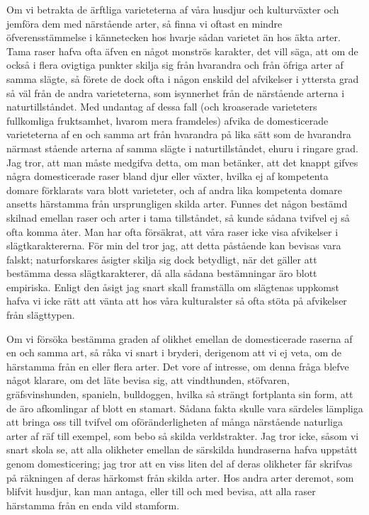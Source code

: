 Om vi betrakta de ärftliga varieteterna af våra husdjur och kulturväxter och jemföra dem med närstående arter, så finna vi oftast en mindre öfverensstämmelse i kännetecken hos hvarje sådan varietet än hos äkta arter. Tama raser hafva ofta äfven en något monströs karakter, det vill säga, att om de också i flera ovigtiga punkter skilja sig från hvarandra och från öfriga arter af samma slägte, så förete de dock ofta i någon enskild del afvikelser i yttersta grad så väl från de andra varieteterna, som isynnerhet från de närstående arterna i naturtillståndet. Med undantag af dessa fall (och kroaserade varieteters fullkomliga fruktsamhet, hvarom mera framdeles) afvika de domesticerade varieteterna af en och samma art från hvarandra på lika sätt som de hvarandra närmast stående arterna af samma slägte i naturtillståndet, ehuru i ringare grad. Jag tror, att man måste medgifva detta, om man betänker, att det knappt gifves några domesticerade raser bland djur eller växter, hvilka ej af kompetenta domare förklarats vara blott varieteter, och af andra lika kompetenta domare ansetts härstamma från ursprungligen skilda arter. Funnes det någon bestämd skilnad emellan raser och arter i tama tillståndet, så kunde sådana tvifvel ej så ofta komma åter. Man har ofta försäkrat, att våra raser icke visa afvikelser i slägtkaraktererna. För min del tror jag, att detta påstående kan bevisas vara falskt; naturforskares åsigter skilja sig dock betydligt, när det gäller att bestämma dessa slägtkarakterer, då alla sådana bestämningar äro blott empiriska. Enligt den åsigt jag snart skall framställa om slägtenas uppkomst hafva vi icke rätt att vänta att hos våra kulturalster så ofta stöta på afvikelser från slägttypen.

Om vi försöka bestämma graden af olikhet emellan de domesticerade raserna af en och samma art, så råka vi snart i bryderi, derigenom att vi ej veta, om de härstamma från en eller flera arter. Det vore af intresse, om denna fråga blefve något klarare, om det läte bevisa sig, att vindthunden, stöfvaren, gräfsvinshunden, spanieln, bulldoggen, hvilka så strängt fortplanta sin form, att de äro afkomlingar af blott en stamart. Sådana fakta skulle vara särdeles lämpliga att bringa oss till tvifvel om oföränderligheten af många närstående naturliga arter af räf till exempel, som bebo så skilda verldstrakter. Jag tror icke, såsom vi snart skola se, att alla olikheter emellan de särskilda hundraserna hafva uppstått genom domesticering; jag tror att en viss liten del af deras olikheter får skrifvas på räkningen af deras härkomst från skilda arter. Hos andra arter deremot, som blifvit husdjur, kan man antaga, eller till och med bevisa, att alla raser härstamma från en enda vild stamform.


